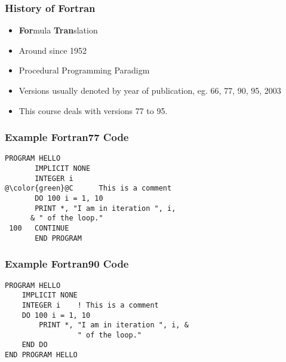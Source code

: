 \begin{frame}
  \frametitle{History of Fortran}
  \begin{itemize}
    \item \textbf{For}mula \textbf{Tran}slation
    \item Around since 1952
    \item Procedural Programming Paradigm
    \item Versions usually denoted by year of publication, eg. 66, 77, 90, 95, 2003
    \item This course deals with versions 77 to 95.
  \end{itemize}
\end{frame}

\begin{frame}[fragile]
  \frametitle{Example Fortran77 Code}
  \begin{lstlisting}[escapechar=@]
       PROGRAM HELLO
       IMPLICIT NONE
       INTEGER i
@\color{green}@C      This is a comment
       DO 100 i = 1, 10
       PRINT *, "I am in iteration ", i,
      & " of the loop."
 100   CONTINUE
       END PROGRAM
  \end{lstlisting}
\end{frame}

\begin{frame}[fragile]
  \frametitle{Example Fortran90 Code}
  \begin{lstlisting}
PROGRAM HELLO
    IMPLICIT NONE
    INTEGER i    ! This is a comment
    DO 100 i = 1, 10
        PRINT *, "I am in iteration ", i, & 
                 " of the loop."
    END DO
END PROGRAM HELLO
  \end{lstlisting}
\end{frame}

